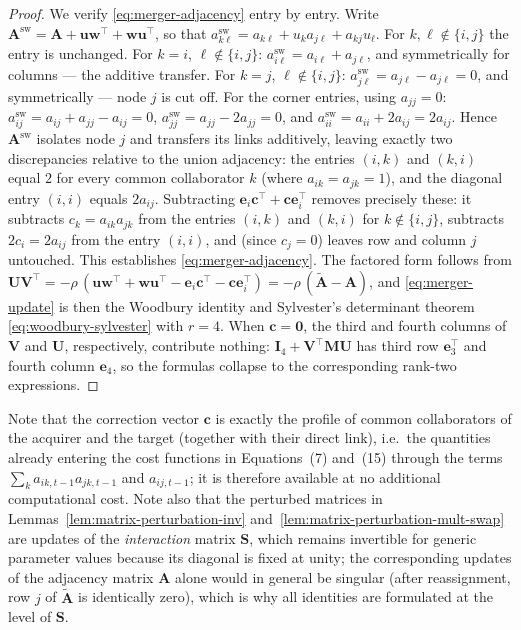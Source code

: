 \begin{proof}
We verify \eqref{eq:merger-adjacency} entry by entry. Write
$\mathbf{A}^{\mathrm{sw}} = \mathbf{A} + \mathbf{u} \mathbf{w}^\top +
\mathbf{w} \mathbf{u}^\top$, so that
$a^{\mathrm{sw}}_{k \ell} = a_{k \ell} + u_k a_{j \ell} + a_{k j}
u_\ell$. For $k, \ell \notin \{i,j\}$ the entry is unchanged. For $k =
i$, $\ell \notin \{i,j\}$: $a^{\mathrm{sw}}_{i \ell} = a_{i \ell} +
a_{j \ell}$, and symmetrically for columns --- the additive transfer.
For $k = j$, $\ell \notin \{i,j\}$: $a^{\mathrm{sw}}_{j \ell} = a_{j
\ell} - a_{j \ell} = 0$, and symmetrically --- node $j$ is cut off. For
the corner entries, using $a_{jj} = 0$:
$a^{\mathrm{sw}}_{ij} = a_{ij} + a_{jj} - a_{ij} = 0$,
$a^{\mathrm{sw}}_{jj} = a_{jj} - 2 a_{jj} = 0$, and
$a^{\mathrm{sw}}_{ii} = a_{ii} + 2 a_{ij} = 2 a_{ij}$. Hence
$\mathbf{A}^{\mathrm{sw}}$ isolates node $j$ and transfers its links
additively, leaving exactly two discrepancies relative to the union
adjacency: the entries $(i, k)$ and $(k, i)$ equal $2$ for every common
collaborator $k$ (where $a_{ik} = a_{jk} = 1$), and the diagonal entry
$(i,i)$ equals $2 a_{ij}$. Subtracting $\mathbf{e}_i \mathbf{c}^\top +
\mathbf{c} \mathbf{e}_i^\top$ removes precisely these: it subtracts
$c_k = a_{ik} a_{jk}$ from the entries $(i,k)$ and $(k,i)$ for $k \notin
\{i, j\}$, subtracts $2 c_i = 2 a_{ij}$ from the entry $(i,i)$, and
(since $c_j = 0$) leaves row and column $j$ untouched. This establishes
\eqref{eq:merger-adjacency}. The factored form follows from
$\mathbf{U} \mathbf{V}^\top = -\rho \, ( \mathbf{u} \mathbf{w}^\top +
\mathbf{w} \mathbf{u}^\top - \mathbf{e}_i \mathbf{c}^\top - \mathbf{c}
\mathbf{e}_i^\top ) = -\rho \, ( \widetilde{\mathbf{A}} - \mathbf{A} )$,
and \eqref{eq:merger-update} is then the Woodbury identity and
Sylvester's determinant theorem \eqref{eq:woodbury-sylvester} with
$r = 4$. When $\mathbf{c} = \mathbf{0}$, the third and fourth columns of
$\mathbf{V}$ and $\mathbf{U}$, respectively, contribute nothing:
$\mathbf{I}_4 + \mathbf{V}^\top \mathbf{M} \mathbf{U}$ has third row
$\mathbf{e}_3^\top$ and fourth column $\mathbf{e}_4$, so the formulas
collapse to the corresponding rank-two expressions.
\end{proof}

Note that the correction vector $\mathbf{c}$ is exactly the profile of
common collaborators of the acquirer and the target (together with their
direct link), i.e.\ the quantities already entering the cost functions
in Equations~(7) and~(15) through the terms $\sum_k a_{ik,t-1}
a_{jk,t-1}$ and $a_{ij,t-1}$; it is therefore available at no
additional computational cost. Note also that the perturbed matrices in
Lemmas~\ref{lem:matrix-perturbation-inv}
and~\ref{lem:matrix-perturbation-mult-swap} are updates of the
\emph{interaction} matrix $\mathbf{S}$, which remains invertible for
generic parameter values because its diagonal is fixed at unity; the
corresponding updates of the adjacency matrix $\mathbf{A}$ alone would
in general be singular (after reassignment, row $j$ of
$\widetilde{\mathbf{A}}$ is identically zero), which is why all identities
are formulated at the level of $\mathbf{S}$.

